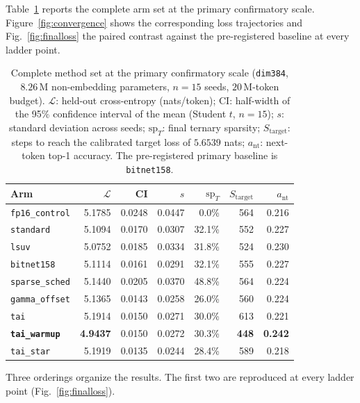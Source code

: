 \documentclass[final,5p,times,twocolumn]{elsarticle}
\theoremstyle{remark}
\begin{document}
Table~\ref{tab:primary} reports the complete arm set at the primary
confirmatory scale. Figure~\ref{fig:convergence} shows the corresponding loss
trajectories and Fig.~\ref{fig:finalloss} the paired contrast against the
pre-registered baseline at every ladder point.

\begin{table}[t]
\centering
\footnotesize
\caption{Complete method set at the primary confirmatory scale
(\texttt{dim384}, $8.26$\,M non-embedding parameters, $n=15$ seeds,
$20$\,M-token budget). $\mathcal{L}$: held-out cross-entropy (nats/token);
CI: half-width of the 95\% confidence interval of the mean
(Student $t$, $n=15$); $s$: standard
deviation across seeds; $\mathrm{sp}_T$: final ternary sparsity;
$S_{\mathrm{target}}$: steps to reach the calibrated target loss of $5.6539$
nats; $a_{\mathrm{nt}}$: next-token top-1 accuracy. The pre-registered primary
baseline is \texttt{bitnet158}.}
\label{tab:primary}
\begin{tabular}{@{}lrrrrrr@{}}
\toprule
Arm & $\mathcal{L}$ & CI & $s$ & $\mathrm{sp}_T$ & $S_{\mathrm{target}}$ & $a_{\mathrm{nt}}$ \\
\midrule
\texttt{fp16\_control} & 5.1785 & 0.0248 & 0.0447 & \phantom{0}0.0\% & 564 & 0.216 \\
\texttt{standard} & 5.1094 & 0.0170 & 0.0307 & 32.1\% & 552 & 0.227 \\
\texttt{lsuv} & 5.0752 & 0.0185 & 0.0334 & 31.8\% & 524 & 0.230 \\
\texttt{bitnet158} & 5.1114 & 0.0161 & 0.0291 & 32.1\% & 555 & 0.227 \\
\texttt{sparse\_sched} & 5.1440 & 0.0205 & 0.0370 & 48.8\% & 564 & 0.224 \\
\texttt{gamma\_offset} & 5.1365 & 0.0143 & 0.0258 & 26.0\% & 560 & 0.224 \\
\texttt{tai} & 5.1914 & 0.0150 & 0.0271 & 30.0\% & 613 & 0.221 \\
\textbf{\texttt{tai\_warmup}} & \textbf{4.9437} & 0.0150 & 0.0272 & 30.3\% & \textbf{448} & \textbf{0.242} \\
\texttt{tai\_star} & 5.1919 & 0.0135 & 0.0244 & 28.4\% & 589 & 0.218 \\
\bottomrule
\end{tabular}
\end{table}

Three orderings organize the results. The first two are reproduced at every
ladder point (Fig.~\ref{fig:finalloss}).
\end{document}
